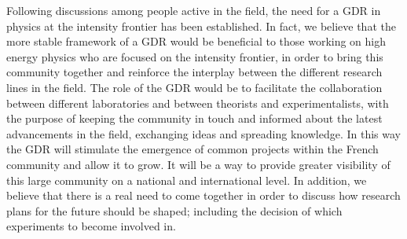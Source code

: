 Following discussions among people active in the field, the need for a GDR in physics at the intensity frontier has been established. In fact, we believe that the more stable framework of a GDR would be beneficial to those working on high energy physics who are focused on the intensity frontier, in order to bring this community together and reinforce the interplay between the different research lines in the field. The role of the GDR would be to 
facilitate the collaboration between different laboratories and between theorists and experimentalists, with the purpose of keeping the community in touch and informed about the latest advancements in the field, exchanging ideas and spreading knowledge. In this way the GDR will stimulate the emergence of common projects within the French community and allow it to grow. It will be a way to provide greater visibility of this large community on a national and international level. In addition, we believe that there is a real need to come together in order to discuss how research plans for the future should be shaped; including the decision of which experiments to become involved in.


